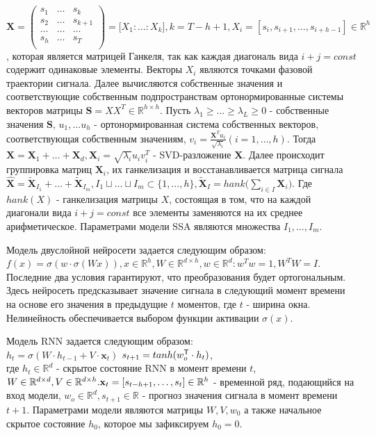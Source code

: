 \documentclass[12pt, twoside]{article}
\begin{document}
$\mathbf{X} = \begin{pmatrix}
s_1 & \dots & s_{k}\\
s_2 & \dots & s_{k+1}\\
\dots & \dots & \dots\\
s_{h} & \dots & s_{T}\\
\end{pmatrix} = \big[X_1 : \dots : X_k\big], k=T-h+1, X_i = [s_i, s_{i+1}, \dots, s_{i + h - 1}] \in \mathbb{R}^h$, которая является матрицей Ганкеля, так как каждая диагональ вида $i+j=const$ содержит одинаковые элементы. Векторы $X_i$ являются точками фазовой траектории сигнала. Далее вычисляются собственные значения и соответствующие собственным подпространствам ортонормированные системы векторов матрицы $\mathbf{S}=XX^T \in \mathbb{R}^{h \times h}$. Пусть $\lambda_1 \ge \dots \ge \lambda_L \ge 0$ - собственные значения $\mathbf{S}$, $u_1, \dots u_h$ - ортонормированная система собственных векторов, соответствующая собственным значениям, $v_i = \frac{\mathbf{X}^Tu_i}{\sqrt{\lambda_i}} (i=1, \dots, h)$. Тогда $\mathbf{X} = \mathbf{X}_1 + \dots + \mathbf{X}_d, \mathbf{X}_i = \sqrt{\lambda_i}u_iv_i^T$ - SVD-разложение $\mathbf{X}$. Далее происходит группировка матриц $\mathbf{X}_i$, их ганкелизация и восстанавливается матрица сигнала $\hat{\mathbf{X}} = \mathbf{\tilde{X}}_{I_1} + \dots + \mathbf{\tilde{X}}_{I_m}, I_1 \sqcup \dots \sqcup I_m \subset \{1, \dots, h\}, \mathbf{\tilde{X}}_{I} = hank\big(\sum\limits_{i \in I}\mathbf{X}_i\big)$. Где $hank(X)$ - ганкелизация матрицы $X$, состоящая в том, что на каждой диагонали вида $i+j=const$ все элементы заменяются на их среднее арифметическое. Параметрами модели SSA являются множества $I_1, \dots, I_m$.


Модель двуслойной нейросети задается следующим образом: $f(x) = \sigma(w\cdot \sigma(Wx)), x \in \mathbb{R}^{h}, W \in \mathbb{R}^{d \times h}, w \in \mathbb{R}^d: w^Tw=1, W^TW=I$. Последние два условия гарантируют, что преобразования будет ортогональным. Здесь нейросеть предсказывает значение сигнала в следующий момент времени на основе его значения в предыдущие $t$ моментов, где $t$ - ширина окна. Нелинейность обеспечивается выбором функции активации $\sigma(x)$.

Модель RNN задается следующим образом: \\
$
h_t = \sigma(W \cdot h_{t-1} + V \cdot \mathbf{x}_t)$
$\\
s_{t+1} = tanh(w_o^{\mathsf{T}} \cdot h_t)
$,\\ где $h_{t} \in \mathbb{R}^{d}$ - скрытое состояние RNN в момент времени $t$, $W \in \mathbb{R}^{d \times d}, V \in \mathbb{R}^{d \times h}. \\
\mathbf{x}_t = [s_{t - h + 1}, \dots, s_{t}] \in \mathbb{R}^h$ - временной ряд, подающийся на вход модели, $w_o \in \mathbb{R}^{d}, s_{t+1} \in \mathbb{R}$ - прогноз значения сигнала в момент времени $t+1$. Параметрами модели являются матрицы $W, V, w_0$ а также начальное скрытое состояние $h_0$, которое мы зафиксируем $h_0=0$.
\end{document}
